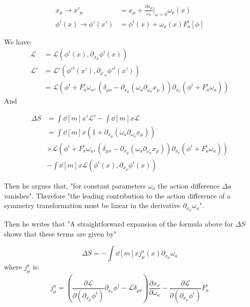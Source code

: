 \documentclass{article}
\begin{document}
\begin{align}
    x_\mu \to x'_\mu &= x_\mu + \frac{\partial x_\mu}{\omega_a}|_{\omega=0} \omega_a(x) \\
    \phi^i(x) \to \phi'(x') &= \phi^i(x) + \omega_a(x)F^i_a[\phi]
\end{align}

We have:
\begin{align}
    \mathcal{L} &= \mathcal{L}(\phi^i(x),\partial_{x_\mu}\phi^i(x)) \\
    \mathcal{L}' &= \mathcal{L'}(\phi'^i(x'),\partial_{x'_\mu}\phi'^i(x')) \\
    &= \mathcal{L}\left(\phi^i+F^i_a\omega_a, 
                    \left(\delta_{\mu\nu}-\partial_{x_\mu}(\omega_a
                    \partial_{\omega_a}x_\mu)\right)
                    \partial_{x_\nu}(\phi^i+F^i_a\omega_a)
                  \right)
\end{align}
And 

\begin{align}
    \Delta S &= \int \dd[m]{x'} \mathcal{L}' - \int \dd[m]{x} \mathcal{L} 
    \label{eq:dS-integrand}\\
    &=
    \int \dd[m]{x}
    \left(1+\partial_{x_\mu}\left(\omega_a \partial_{\omega_a}x_\mu\right) \right) 
    \nonumber\\
    &\times \mathcal{L}\left(
                    \phi^i+F^i_a\omega_a, 
                    \left(\delta_{\mu\nu}-\partial_{x_\mu}\left(\omega_a
                        \partial_{\omega_a}x_\mu\right)\right)
                        \partial_{x_\nu}(\phi^i+F^i_a\omega_a)
                    \right) \nonumber\\
    &- \int \dd[m]{x}  \mathcal{L}(\phi^i(x),\partial_{x_\mu}\phi^i(x))
\end{align}

Then he argues that, "for constant parameters $\omega_a$ the action difference
$\Delta a$ vanishes". Therefore "the leading contribution to the action
difference of a symmetry transformation must be linear in the derivative
$\partial_{x_\mu}\omega_a$".

Then he writes that "A straightforward expansion of the formula above
for $\Delta S$ shows that these terms are given by"

\begin{equation}
    \Delta S = -\int \dd[m]{x} j^a_\mu (x) \partial_{x_\mu}\omega_a
\end{equation}
where $j^a_\mu$ is:
\begin{equation}
    j^a_\mu = \left(
        \frac{\partial \mathcal{L}}{\partial(\partial_{x_\mu}\phi^i)}
            \partial_{x_\nu}\phi^i
        -\mathcal{L}\delta_{\mu\nu} \right) \frac{\partial x_\nu}{\partial\omega_a}
    - \frac{\partial\mathcal{L}}{\partial(\partial_{x_\mu}\phi^i)} F^i_a
\end{equation}
\end{document}
